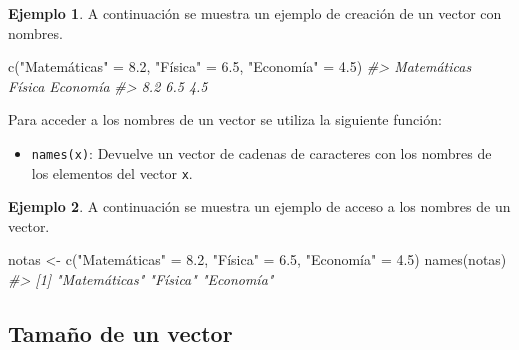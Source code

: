 \documentclass[
]{book}
\newenvironment{Shaded}{\begin{snugshade}}{\end{snugshade}}
\newcommand{\CommentTok}[1]{\textcolor[rgb]{0.56,0.35,0.01}{\textit{#1}}}
\newcommand{\FloatTok}[1]{\textcolor[rgb]{0.00,0.00,0.81}{#1}}
\newcommand{\FunctionTok}[1]{\textcolor[rgb]{0.00,0.00,0.00}{#1}}
\newcommand{\NormalTok}[1]{#1}
\newcommand{\OtherTok}[1]{\textcolor[rgb]{0.56,0.35,0.01}{#1}}
\newcommand{\StringTok}[1]{\textcolor[rgb]{0.31,0.60,0.02}{#1}}
\providecommand{\tightlist}{%
  \setlength{\itemsep}{0pt}\setlength{\parskip}{0pt}}
\theoremstyle{definition}
\theoremstyle{definition}
\newtheorem{example}{Ejemplo}[chapter]
\theoremstyle{definition}
\theoremstyle{definition}
\theoremstyle{remark}
\begin{document}
\begin{example}

A continuación se muestra un ejemplo de creación de un vector con nombres.

\begin{Shaded}
\begin{Highlighting}[]
\FunctionTok{c}\NormalTok{(}\StringTok{"Matemáticas"} \OtherTok{=} \FloatTok{8.2}\NormalTok{, }\StringTok{"Física"} \OtherTok{=} \FloatTok{6.5}\NormalTok{, }\StringTok{"Economía"} \OtherTok{=} \FloatTok{4.5}\NormalTok{)}
\CommentTok{\#\textgreater{} Matemáticas      Física    Economía }
\CommentTok{\#\textgreater{}         8.2         6.5         4.5}
\end{Highlighting}
\end{Shaded}

\end{example}

Para acceder a los nombres de un vector se utiliza la siguiente función:

\begin{itemize}
\tightlist
\item
  \texttt{names(x)}: Devuelve un vector de cadenas de caracteres con los nombres de los elementos del vector \texttt{x}.
\end{itemize}

\begin{example}

A continuación se muestra un ejemplo de acceso a los nombres de un vector.

\begin{Shaded}
\begin{Highlighting}[]
\NormalTok{notas }\OtherTok{\textless{}{-}} \FunctionTok{c}\NormalTok{(}\StringTok{"Matemáticas"} \OtherTok{=} \FloatTok{8.2}\NormalTok{, }\StringTok{"Física"} \OtherTok{=} \FloatTok{6.5}\NormalTok{, }\StringTok{"Economía"} \OtherTok{=} \FloatTok{4.5}\NormalTok{)}
\FunctionTok{names}\NormalTok{(notas)}
\CommentTok{\#\textgreater{} [1] "Matemáticas" "Física"      "Economía"}
\end{Highlighting}
\end{Shaded}

\end{example}

\hypertarget{tamauxf1o-de-un-vector}{%
\subsection{Tamaño de un vector}\label{tamauxf1o-de-un-vector}}
\end{document}

